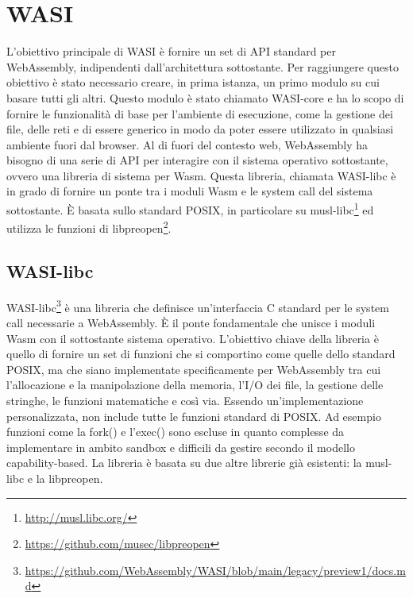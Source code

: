 \chapter{WASI}
\label{chap:wasi-in-depth}
L'obiettivo principale di WASI è fornire un set di API standard per WebAssembly, indipendenti dall'architettura
sottostante. Per raggiungere questo obiettivo è stato necessario creare, in prima istanza, un primo modulo su cui basare
tutti gli altri. Questo modulo è stato chiamato WASI-core e ha lo scopo di fornire le funzionalità di base per
l'ambiente di esecuzione, come la gestione dei file, delle reti e di essere generico in modo da poter essere utilizzato
in qualsiasi ambiente fuori dal browser. Al di fuori del contesto web, WebAssembly ha bisogno di una serie di API per
interagire con il sistema operativo sottostante, ovvero una libreria di sistema per Wasm. Questa libreria, chiamata
WASI-libc è in grado di fornire un ponte tra i moduli Wasm e le system call del sistema sottostante. È basata sullo
standard POSIX\cite{posix-standard}, in particolare su musl-libc\footnote{\url{http://musl.libc.org/}} ed utilizza le
funzioni di libpreopen\footnote{\url{https://github.com/musec/libpreopen}}.

\section{WASI-libc}
WASI-libc\footnote{\url{https://github.com/WebAssembly/WASI/blob/main/legacy/preview1/docs.md}} è una libreria che
definisce un'interfaccia C standard per le system call necessarie a WebAssembly. È il ponte fondamentale che unisce i
moduli Wasm con il sottostante sistema operativo. L'obiettivo chiave della libreria è quello di fornire un set di
funzioni che si comportino come quelle dello standard POSIX, ma che siano implementate specificamente per WebAssembly
tra cui l'allocazione e la manipolazione della memoria, l'I/O dei file, la gestione delle stringhe, le funzioni
matematiche e così via. Essendo un'implementazione personalizzata, non include tutte le funzioni standard di POSIX. Ad
esempio funzioni come la fork() e l'exec() sono escluse in quanto complesse da implementare in ambito sandbox e
difficili da gestire secondo il modello capability-based. La libreria è basata su due altre librerie già esistenti: la
musl-libc e la libpreopen.
